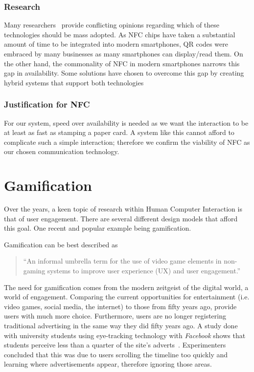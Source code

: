 \subsubsection{Research}
Many researchers~\cite{qr1}\cite{qr2}\cite{nfc1}\cite{nfc2} provide conflicting opinions regarding which of these technologies should be mass adopted. As NFC chips have taken a substantial amount of time to be integrated into modern smartphones, QR codes were embraced by many businesses as many smartphones can display/read them. On the other hand, the commonality of NFC in modern smartphones narrows this gap in availability. Some solutions have chosen to overcome this gap by creating hybrid systems that support both technologies~\cite{NFCandQR}

\subsubsection{Justification for NFC}
For our system, speed over availability is needed as we want the interaction to be at least as fast as stamping a paper card. A system like this cannot afford to complicate such a simple interaction; therefore we confirm the viability of NFC as our chosen communication technology. 

\clearpage{}
\section{Gamification}
Over the years, a keen topic of research within Human Computer Interaction is that of user engagement. There are several different design models that afford this goal. One recent and popular example being gamification. 

Gamification can be best described as
\begin{quotation}
\noindent
``An informal umbrella term for the use of video game elements in non-gaming systems to improve user experience (UX) and user engagement.''~\cite[p.~2425]{Deterding:2011:GUG:1979742.1979575}
 \end{quotation}

The need for gamification comes from the modern zeitgeist of the digital world, a world of engagement. Comparing the current opportunities for entertainment (i.e. video games, social media, the internet) to those from fifty years ago, provide users with much more choice. Furthermore, users are no longer registering traditional advertising in the same way they did fifty years ago. A study done with university students using eye-tracking technology with \emph{Facebook} shows that students perceive less than a quarter of the site's adverts~\cite{barreto2013users}. Experimenters concluded that this was due to users scrolling the timeline too quickly and learning where advertisements appear, therefore ignoring those areas. 

